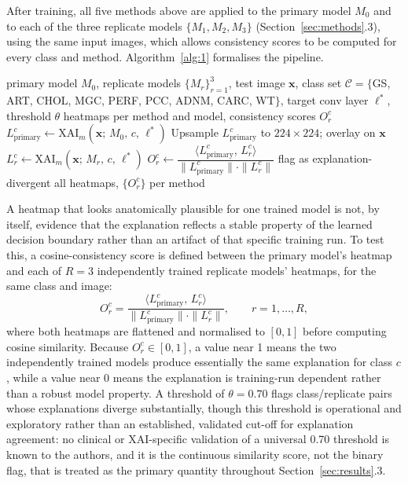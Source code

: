 After training, all five methods above are applied to the primary model $M_0$ and to each of the three replicate models $\{M_1,M_2,M_3\}$ (Section~\ref{sec:methods}.3), using the same input images, which allows consistency scores to be computed for every class and method. Algorithm~\ref{alg:1} formalises the pipeline.

\begin{algorithm}[tb]
\caption{XAI Pipeline with Consistency Scoring}
\label{alg:1}
\begin{algorithmic}[1]
\Require primary model $M_0$, replicate models $\{M_r\}_{r=1}^{3}$, test image $\mathbf{x}$, class set $\mathcal{C} = \{$GS, ART, CHOL, MGC, PERF, PCC, ADNM, CARC, WT$\}$, target conv layer $\ell^*$, threshold $\theta$
\Ensure heatmaps per method and model, consistency scores $O_r^c$
    \State $L^c_{\text{primary}} \leftarrow \text{XAI}_m(\mathbf{x};\,M_0,\,c,\,\ell^*)$
    \State Upsample $L^c_{\text{primary}}$ to $224{\times}224$; overlay on $\mathbf{x}$
      \State $L^c_r \leftarrow \text{XAI}_m(\mathbf{x};\,M_r,\,c,\,\ell^*)$
      \State $O_r^c \leftarrow \dfrac{\langle L^c_{\text{primary}},\,L^c_r\rangle}{\|L^c_{\text{primary}}\|\cdot\|L^c_r\|}$
        \State flag as explanation-divergent
      \EndIf
    \EndFor
  \EndFor
\EndFor
\State \Return all heatmaps, $\{O_r^c\}$ per method
\end{algorithmic}
\end{algorithm}

A heatmap that looks anatomically plausible for one trained model is not, by itself, evidence that the explanation reflects a stable property of the learned decision boundary rather than an artifact of that specific training run. To test this, a cosine-consistency score is defined between the primary model's heatmap and each of $R{=}3$ independently trained replicate models' heatmaps, for the same class and image:
\begin{equation}
O_r^c = \frac{\langle L^c_{\text{primary}},\, L^c_r \rangle}{\|L^c_{\text{primary}}\| \cdot \|L^c_r\|},\qquad r=1,\dots,R,
\end{equation}
where both heatmaps are flattened and normalised to $[0,1]$ before computing cosine similarity. Because $O_r^c \in [0,1]$, a value near 1 means the two independently trained models produce essentially the same explanation for class $c$, while a value near 0 means the explanation is training-run dependent rather than a robust model property. A threshold of $\theta = 0.70$ flags class/replicate pairs whose explanations diverge substantially, though this threshold is operational and exploratory rather than an established, validated cut-off for explanation agreement: no clinical or XAI-specific validation of a universal 0.70 threshold is known to the authors, and it is the continuous similarity score, not the binary flag, that is treated as the primary quantity throughout Section~\ref{sec:results}.3.

